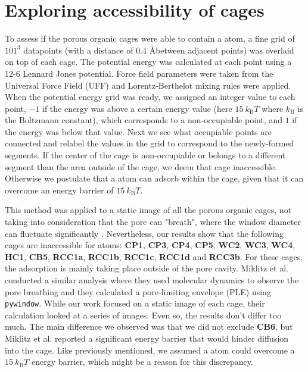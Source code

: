 \documentclass[journal=jacsat,manuscript=article]{achemso}
\begin{document}
\clearpage

\section{Exploring accessibility of cages}
To assess if the porous organic cages were able to contain a  atom, a fine grid of $101^3$ datapoints (with a distance of $0.4$ \AA between adjacent points) was overlaid on top of each cage. The potential energy was calculated at each point using a 12-6 Lennard Jones potential. Force field parameters were taken from the Universal Force Field (UFF) and Lorentz-Berthelot mixing rules were applied. When the potential energy grid was ready, we assigned an integer value to each point, $-1$ if the energy was above a certain energy value (here $15 \ k_\text{B}T$ where $k_\text{B}$ is the Boltzmann constant), which corresponds to a non-occupiable point, and $1$ if the energy was below that value. Next we see what occupiable points are connected and relabel the values in the grid to correspond to the newly-formed segments. If the center of the cage is non-occupiable or belongs to a different segment than the area outside of the cage, we deem that cage inaccessible. Otherwise we postulate that a  atom can adsorb within the cage, given that it can overcome an energy barrier of $15 \ k_\text{B}T$.

This method was applied to a static image of all the porous organic cages, not taking into consideration that the pore can "breath", where the window diameter can fluctuate significantly \cite{miklitz2017computational}. Nevertheless, our results show that the following cages are inaccessible for  atoms: \textbf{CP1}, \textbf{CP3}, \textbf{CP4}, \textbf{CP5}, \textbf{WC2}, \textbf{WC3}, \textbf{WC4}, \textbf{HC1}, \textbf{CB5}, \textbf{RCC1a}, \textbf{RCC1b}, \textbf{RCC1c}, \textbf{RCC1d} and \textbf{RCC3b}. For these cages, the adsorption is mainly taking place outside of the pore cavity. Miklitz et al.\cite{miklitz2017computational} conducted a similar analysis where they used molecular dynamics to observe the pore breathing and they calculated a pore-limiting envelope (PLE) using \texttt{pywindow}. While our work focused on a static image of each cage, their calculation looked at a series of images. Even so, the results don't differ too much. The main difference we observed was that we did not exclude \textbf{CB6}, but Miklitz et al. reported a significant energy barrier that would hinder diffusion into the cage. Like previously mentioned, we assumed a  atom could overcome a $15 \ k_\text{B}T$ energy barrier, which might be a reason for this discrepancy.
\end{document}
